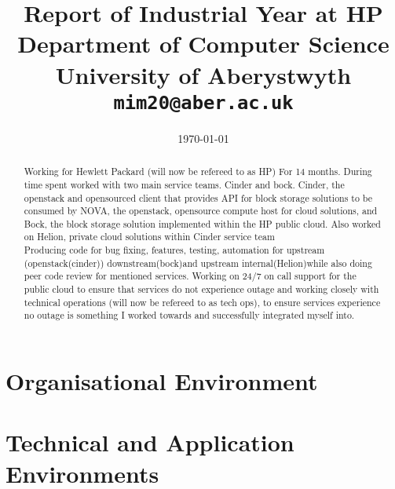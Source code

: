 \documentclass[11pt,a4paper]{report}
\begin{document}
\title{Report of Industrial Year at HP\\Department of Computer Science\\ University of Aberystwyth\\ \texttt{mim20@aber.ac.uk}} \date{\today}
\maketitle

\begin{abstract} 

Working for Hewlett Packard (will now be refereed to as HP) For 14 months. During time spent worked with two main service teams. Cinder and bock. Cinder, the openstack and opensourced client that provides API for block storage solutions to be consumed by NOVA, the openstack, opensource compute host for cloud solutions, and Bock, the block storage solution implemented within the HP public cloud. Also worked on Helion, private cloud solutions within Cinder service team\\ 
Producing code for bug fixing, features, testing, automation for upstream (openstack(cinder)) downstream(bock)and upstream internal(Helion)while also doing peer code review for mentioned services. 
Working on 24/7 on call support for the public cloud to ensure that services do not experience outage and working closely with technical operations (will now be refereed to as tech ops), to ensure services experience no outage is something I worked towards and successfully integrated myself into.

\end{abstract}

\tableofcontents
\newpage
\section{Organisational Environment}
 


\section{Technical and Application Environments}

\end{document}
